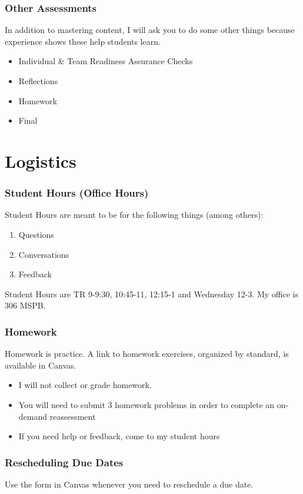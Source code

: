 \documentclass[aspectratio=1610]{beamer}
\begin{document}
\begin{frame}\frametitle{Other Assessments}
In addition to mastering content, I will ask you to do some other things because experience shows these help students learn.
\begin{itemize}
\item Individual \& Team Readiness Assurance Checks
\item Reflections 
\item Homework
\item Final
\end{itemize}
\end{frame}

\section{Logistics}

\begin{frame}\frametitle{Student Hours (Office Hours)}
Student Hours are meant to be for the following things (among others):
\begin{enumerate}
\item Questions
\item Conversations
\item Feedback
\end{enumerate}

\vspace{0.2in}

Student Hours are TR 9-9:30, 10:45-11, 12:15-1 and Wednesday 12-3. My office is 306 MSPB.
\end{frame}



\begin{frame}\frametitle{Homework}
Homework is practice.  A link to homework exercises, organized by standard, is available in Canvas.
\begin{itemize}
\item I will not collect or grade homework.
\item You will need to submit 3 homework problems in order to complete an on-demand reassessment
\item If you need help or feedback, come to my student hours 
\end{itemize}
\end{frame}



\begin{frame}\frametitle{Rescheduling Due Dates}

Use the form in Canvas whenever you need to reschedule a due date.

\end{frame}
\end{document}
